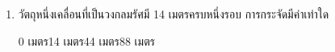 \begin{enumerate}
	\item \runningj  \nonet  วัตถุหนึ่งเคลื่อนที่เป็นวงกลมรัศมี   14  เมตรครบหนึ่งรอบ   การกระจัดมีค่าเท่าใด 
	\begin{4c}
		{0 เมตร}{14 เมตร}{44 เมตร}{88 เมตร}
	\end{4c}
\end{enumerate}
